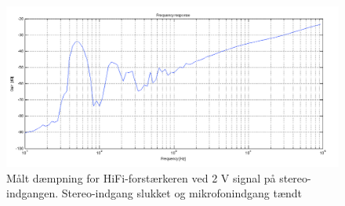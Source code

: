 \begin{figure}[h]
\centering
\includegraphics[width=\textwidth]{maalerapporter/final/daempning/final_daempning_stereo_2v_micon.png}
\caption{Målt dæmpning for HiFi-forstærkeren ved 2 V signal på stereo-indgangen. Stereo-indgang slukket og mikrofonindgang tændt}
\label{maalerapport_final16}
\end{figure}